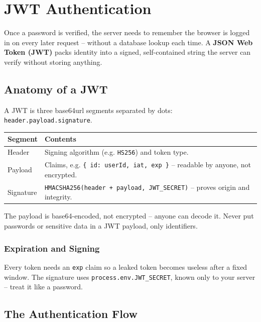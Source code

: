 \chapter{JWT Authentication}

Once a password is verified, the server needs to remember the browser is logged in on every later request -- without a database lookup each time. A \textbf{JSON Web Token (JWT)} packs identity into a signed, self-contained string the server can verify without storing anything.

\section{Anatomy of a JWT}

A JWT is three base64url segments separated by dots: \texttt{header.payload.signature}.

\begin{center}
\begin{tabularx}{\textwidth}{lX}
\toprule
\textbf{Segment} & \textbf{Contents} \\
\midrule
Header & Signing algorithm (e.g. \texttt{HS256}) and token type. \\
Payload & Claims, e.g. \texttt{\{ id: userId, iat, exp \}} -- readable by anyone, not encrypted. \\
Signature & \texttt{HMACSHA256(header + payload, JWT\_SECRET)} -- proves origin and integrity. \\
\bottomrule
\end{tabularx}
\end{center}

\begin{warnbox}[WARNING]
The payload is base64-encoded, not encrypted -- anyone can decode it. Never put passwords or sensitive data in a JWT payload, only identifiers.
\end{warnbox}

\subsection{Expiration and Signing}

Every token needs an \texttt{exp} claim so a leaked token becomes useless after a fixed window. The signature uses \texttt{process.env.JWT\_SECRET}, known only to your server -- treat it like a password.

\section{The Authentication Flow}

